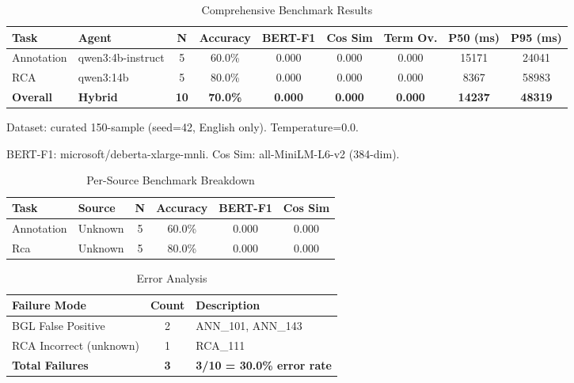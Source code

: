 
\begin{table}[h]
\centering
\caption{Comprehensive Benchmark Results}
\label{tab:comprehensive-results}
\begin{tabular}{llccccccc}
\toprule
\textbf{Task} & \textbf{Agent} & \textbf{N} & \textbf{Accuracy} & \textbf{BERT-F1} & \textbf{Cos Sim} & \textbf{Term Ov.} & \textbf{P50 (ms)} & \textbf{P95 (ms)} \\
\midrule
Annotation & qwen3:4b-instruct & 5 & 60.0\% & 0.000 & 0.000 & 0.000 & 15171 & 24041 \\
RCA & qwen3:14b & 5 & 80.0\% & 0.000 & 0.000 & 0.000 & 8367 & 58983 \\
\midrule
\textbf{Overall} & \textbf{Hybrid} & \textbf{10} & \textbf{70.0\%} & \textbf{0.000} & \textbf{0.000} & \textbf{0.000} & \textbf{14237} & \textbf{48319} \\
\bottomrule
\end{tabular}
\begin{tablenotes}
\small
\item Dataset: curated 150-sample (seed=42, English only). Temperature=0.0.
\item BERT-F1: microsoft/deberta-xlarge-mnli. Cos Sim: all-MiniLM-L6-v2 (384-dim).
\end{tablenotes}
\end{table}


\begin{table}[h]
\centering
\caption{Per-Source Benchmark Breakdown}
\label{tab:per-source}
\begin{tabular}{llcccc}
\toprule
\textbf{Task} & \textbf{Source} & \textbf{N} & \textbf{Accuracy} & \textbf{BERT-F1} & \textbf{Cos Sim} \\
\midrule
Annotation & Unknown & 5 & 60.0\% & 0.000 & 0.000 \\
Rca & Unknown & 5 & 80.0\% & 0.000 & 0.000 \\
\bottomrule
\end{tabular}
\end{table}


\begin{table}[h]
\centering
\caption{Error Analysis}
\label{tab:error-analysis}
\begin{tabular}{lcp{8cm}}
\toprule
\textbf{Failure Mode} & \textbf{Count} & \textbf{Description} \\
\midrule
BGL False Positive & 2 & ANN_101, ANN_143 \\
RCA Incorrect (unknown) & 1 & RCA_111 \\
\midrule
\textbf{Total Failures} & \textbf{3} & \textbf{3/10 = 30.0\% error rate} \\
\bottomrule
\end{tabular}
\end{table}


